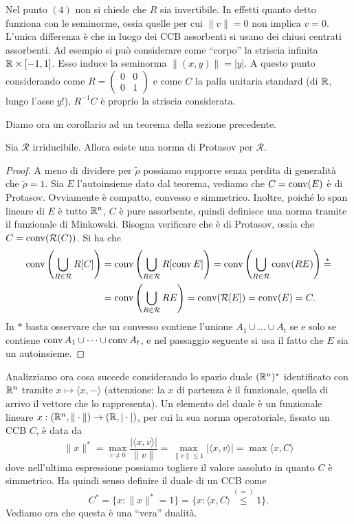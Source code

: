 \begin{osservazione}
	Nel punto $(4)$ non si chiede che $R$ sia invertibile. In effetti quanto detto funziona con le seminorme, ossia quelle per cui $\|v\|=0$ non implica $v = 0$. L'unica differenza è che in luogo dei CCB assorbenti si usano dei chiusi centrati assorbenti. Ad esempio si può considerare come ``corpo'' la striscia infinita $\mathbb{R}\times[-1,1]$. Esso induce la seminorma $\|(x,y)\| = |y|$. A questo punto considerando come $R = \begin{pmatrix}0 & 0 \\ 0 & 1\end{pmatrix}$ e come $C$ la palla unitaria standard (di $\mathbb{R}$, lungo l'asse $y$!), $R^{-1}C$ è proprio la striscia considerata. 
\end{osservazione}


Diamo ora un corollario ad un teorema della sezione precedente.
\begin{corollario}
	Sia $\mathcal R$ irriducibile. Allora esiste una norma di Protasov per $\mathcal R$.
\end{corollario}
\begin{proof}
	A meno di dividere per $\tilde\rho$ possiamo supporre senza perdita di generalità che $\tilde\rho = 1$. 
	Sia $E$ l'autoinsieme dato dal teorema, vediamo che $C = \operatorname{conv}(E)$ è di Protasov. Ovviamente è compatto, convesso e simmetrico. Inoltre, poiché lo span lineare di $E$ è tutto $\mathbb{R}^{n}$, $C$ è pure assorbente, quindi definisce una norma tramite il funzionale di Minkowski. 
	Bisogna verificare che è di Protasov, ossia che $C = \operatorname{conv}(\mathcal R(C))$. Si ha che 
	\begin{align*}
		\operatorname{conv}\left(\bigcup_{R\in\mathcal R}R[C]\right) &= 
		\operatorname{conv}\left(\bigcup_{R\in\mathcal R}R[\operatorname{conv} E]\right) = 
		\operatorname{conv}\left(\bigcup_{R\in\mathcal R}\operatorname{conv}(RE)\right) \overset{*}{=} \\ &= 
		\operatorname{conv}\left(\bigcup_{R\in\mathcal R}RE\right) = 
		\operatorname{conv}(\mathcal R[E]) = 
		\operatorname{conv}(E) = C.
	\end{align*}
	In $*$ basta osservare che un convesso contiene l'unione $A_{1}\cup\dots\cup A_{t}$ se e solo se contiene $\operatorname{conv} A_{1}\cup\dots\cup\operatorname{conv} A_{t}$, e nel passaggio seguente si usa il fatto che $E$ sia un autoinsieme.
\end{proof}

Analizziamo ora cosa succede considerando lo spazio duale $(\mathbb{R}^{n})^{*}$ identificato con $\mathbb{R}^{n}$ tramite $x\mapsto\langle x, -\rangle$ (attenzione: la $x$ di partenza è il funzionale, quella di arrivo il vettore che lo rappresenta). Un elemento del duale è un funzionale lineare $x:(\mathbb{R}^{n}, \|\cdot\|)\to(\mathbb{R}, |\cdot|)$, per cui la sua norma operatoriale, fissato un CCB $C$, è data da 
$$\|x\|^{*} = \max_{v\neq0}\frac{|\langle x, v\rangle|}{\|v\|} = \max_{\|v\|\leq1}|\langle x, v\rangle| = \max\langle x, C\rangle$$
dove nell'ultima espressione possiamo togliere il valore assoluto in quanto $C$ è simmetrico. 
Ha quindi senso definire il duale di un CCB come 
$$C^{*} = \{x: \|x\|^{*} = 1\} = \{x:\langle x, C\rangle \overset{(=)}{\leq} 1\}.$$
Vediamo ora che questa è una ``vera'' dualità.

